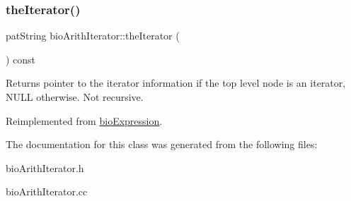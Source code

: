 \mbox{\label{classbio_arith_iterator_a0e3f7a50861a44e7a62216e5a192a838}} 
\subsubsection{\texorpdfstring{the\+Iterator()}{theIterator()}}
{\footnotesize\ttfamily pat\+String bio\+Arith\+Iterator\+::the\+Iterator (\begin{DoxyParamCaption}{ }\end{DoxyParamCaption}) const\hspace{0.3cm}{\ttfamily [virtual]}}

\begin{DoxyReturn}{Returns}
pointer to the iterator information if the top level node is an iterator, N\+U\+LL otherwise. Not recursive. 
\end{DoxyReturn}


Reimplemented from \hyperlink{classbio_expression_a9830c0cf012012c811b826adc54291f6}{bio\+Expression}.



The documentation for this class was generated from the following files\+:\begin{DoxyCompactItemize}
\item 
bio\+Arith\+Iterator.\+h\item 
bio\+Arith\+Iterator.\+cc\end{DoxyCompactItemize}
